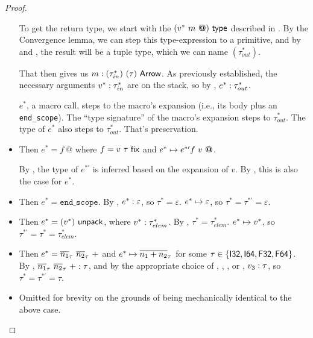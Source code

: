 \documentclass[acmsmall, review]{acmart}
\theoremstyle{definition}
\begin{document}
\begin{proof}
\begin{itemize}
        To get the return type, we start with the $(v^* ~ m ~ \textbf{@}) ~ \mathsf{type}$ described in .
        By the Convergence lemma, we can step this type-expression to a primitive, and by  and , the result will be a tuple type, which we can name $(\tau_{out}^*)$.
        
        That then gives us $m : (\tau_{in}^*) ~ (\tau) ~ \mathsf{Arrow}$.
        As previously established, the necessary arguments $v^* : \tau_{in}^*$ are on the stack,
        so by , $e^* : \tau_{out}^*$.
        
        $e^*$, a macro call, steps to the macro's expansion (i.e., its body plus an \texttt{end_scope}). The ``type signature'' of the macro's expansion steps to $\tau_{out}^*$. The type of $e^*$ also steps to $\tau_{out}^*$. That's preservation.
    
    \item {}
        Then $e^* = f~ \textbf{@}$ where $f = v ~ \tau ~ \mathsf{fix}$ and $e^* \mapsto e^{*\prime} f~ v~ \textbf{@}$.
        
        By , the type of $e^{*\prime}$ is inferred based on the expansion of $v$.
        By , this is also the case for $e^*$.
    
    \item {}
        Then $e^* = \texttt{end_scope}$. By , $e^* : \varepsilon$, so $\tau^* = \varepsilon$. $e^* \mapsto \varepsilon$, so $\tau^* = \tau^{*\prime} = \varepsilon$.
    
    \item {}
        Then $e^* = (v^*) ~ \mathsf{unpack}$, where $v^* : \tau_{elem}^*$.
        By , $\tau^* = \tau_{elem}^*$. $e^* \mapsto v^*$, so $\tau^{*\prime} = \tau^* = \tau_{elem}^*$.
    
    \item {}
        Then $e^* = \overline{n_1}_\tau~ \overline{n_2}_\tau~ +$ and $e^* \mapsto \overline{n_1 + n_2}_\tau$ for some $\tau \in \{\mathsf{I32}, \mathsf{I64}, \mathsf{F32}, \mathsf{F64}\}$.
        By , $\overline{n_1}_\tau~ \overline{n_2}_\tau~ + : \tau$, and by the appropriate choice of , , , or , $v_3 : \tau$, so $\tau^* = \tau^{*\prime} = \tau$.
    
    \item {}
        Omitted for brevity on the grounds of being mechanically identical to the above case.
    

\end{itemize}
\end{proof}
\end{document}
